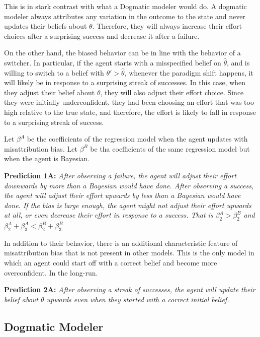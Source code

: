 \documentclass[
  12pt,
]{article}
\begin{document}
This is in stark contrast with what a Dogmatic modeler would do. A
dogmatic modeler always attributes any variation in the outcome to the
state and never updates their beliefs about \(\theta\). Therefore, they
will always increase their effort choices after a surprising success and
decrease it after a failure.

On the other hand, the biased behavior can be in line with the behavior
of a switcher. In particular, if the agent starts with a misspecified
belief on \(\hat{\theta}\), and is willing to switch to a belief with
\(\theta'>\hat{\theta}\), whenever the paradigm shift happens, it will
likely be in response to a surprising streak of successes. In this case,
when they adjust their belief about \(\theta\), they will also adjust
their effort choice. Since they were initially underconfident, they had
been choosing an effort that was too high relative to the true state,
and therefore, the effort is likely to fall in response to a surprising
streak of success.

Let \(\beta^A\) be the coefficients of the regression model when the
agent updates with misattribution bias. Let \(\beta^B\) be tha
coefficients of the same regression model but when the agent is
Bayesian.

\textbf{Prediction 1A:} \emph{After observing a failure, the agent will
adjust their effort downwards by more than a Bayesian would have done.
After observing a success, the agent will adjust their effort upwards by
less than a Bayesian would have done. If the bias is large enough, the
agent might not adjust their effort upwards at all, or even decrease
their effort in response to a success. That is \(\beta_2^A > \beta_2^B\)
and \(\beta_2^A + \beta_3^A<\beta_2^B + \beta_3^B\)}

In addition to their behavior, there is an additional characteristic
feature of misattribution bias that is not present in other models. This
is the only model in which an agent could start off with a correct
belief and become more overconfident. In the long-run.

\textbf{Prediction 2A:} \emph{After observing a streak of successes, the
agent will update their belief about \(\theta\) upwards even when they
started with a correct initial belief.}

\hypertarget{dogmatic-modeler}{%
\subsection{Dogmatic Modeler}\label{dogmatic-modeler}}
\end{document}
